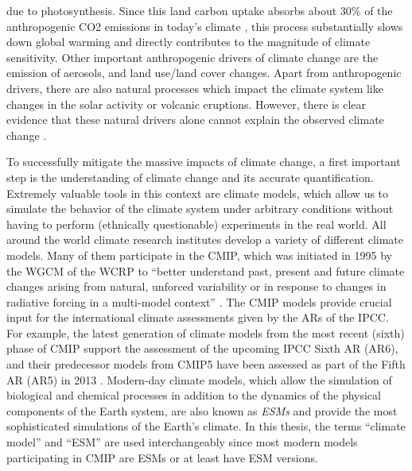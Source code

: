 due to photosynthesis. Since this land carbon uptake absorbs about $30
\unit{\%}$ of the anthropogenic \ac{CO2} emissions in today's climate
\autocite{Friedlingstein2020}, this process substantially slows down global
warming and directly contributes to the magnitude of climate sensitivity. Other
important anthropogenic drivers of climate change are the emission of aerosols,
and land use/land cover changes. Apart from anthropogenic drivers, there are
also natural processes which impact the climate system like changes in the
solar activity or volcanic eruptions. However, there is clear evidence that
these natural drivers alone cannot explain the observed climate change
\autocite{Haustein2017}.

To successfully mitigate the massive impacts of climate change, a first
important step is the understanding of climate change and its accurate
quantification. Extremely valuable tools in this context are climate models,
which allow us to simulate the behavior of the climate system under arbitrary
conditions without having to perform (ethnically questionable) experiments in
the real world. All around the world climate research institutes develop a
variety of different climate models. Many of them participate in the \ac{CMIP},
which was initiated in 1995 by the \ac{WGCM} of the \ac{WCRP} to
\enquote{better understand past, present and future climate changes arising
  from natural, unforced variability or in response to changes in radiative
  forcing in a multi-model context} \autocite{WCRP2020}. The \ac{CMIP} models
provide crucial input for the international climate assessments given by the
\acp{AR} of the \ac{IPCC}. For example, the latest generation of climate models
from the most recent (sixth) phase of \ac{CMIP}  support the assessment of the upcoming \ac{IPCC} Sixth
\acl{AR} (\acs{AR}6), and their predecessor models from \acs{CMIP}5
\autocite{Taylor2012} have been assessed as part of the Fifth \acl{AR}
(\acs{AR}5) in 2013 \autocite{Flato2013}. Modern-day climate models, which
allow the simulation of biological and chemical processes in addition to the
dynamics of the physical components of the Earth system, are also known as
\emph{\acp{ESM}} and provide the most sophisticated simulations of the Earth's
climate. In this thesis, the terms \enquote{climate model} and
\enquote{\acl{ESM}} are used interchangeably since most modern models
participating in \ac{CMIP} are \acp{ESM} or at least have \ac{ESM} versions.

